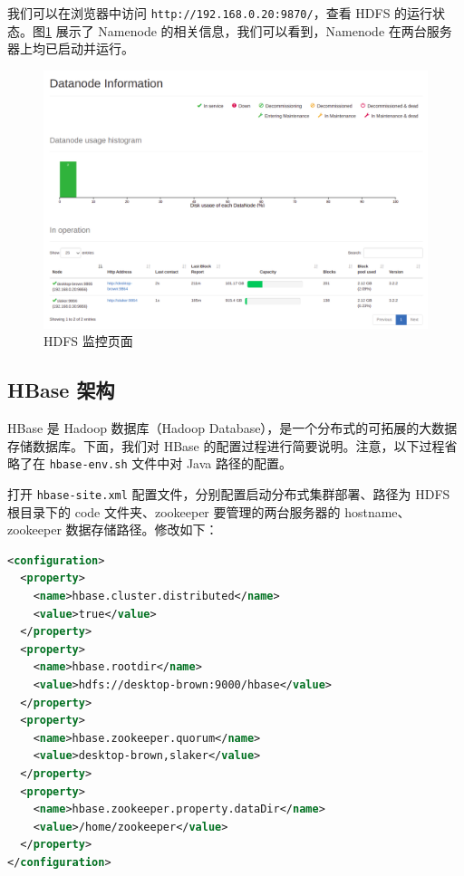 \documentclass{ctexart}
\newcommand{\code}[1]{\colorbox{backcolor}{\lstinline|#1|}}
\begin{document}
    我们可以在浏览器中访问 \code{http://192.168.0.20:9870/}，查看 HDFS 的运行状态。图\ref{fig:archicture_hdfs-web} 展示了 Namenode 的相关信息，我们可以看到，Namenode 在两台服务器上均已启动并运行。

    \begin{figure}[t]
        \centering
        \includegraphics[width=\textwidth]{src/archicture_hdfs-web}
        \caption{HDFS 监控页面}
        \label{fig:archicture_hdfs-web}
    \end{figure}

    \subsection{HBase 架构}\label{subsec:crawl}

    HBase 是 Hadoop 数据库（Hadoop Database），是一个分布式的可拓展的大数据存储数据库\cite{docs-hbase}。下面，我们对 HBase 的配置过程进行简要说明。注意，以下过程省略了在 \code{hbase-env.sh} 文件中对 Java 路径的配置。

    打开 \code{hbase-site.xml} 配置文件，分别配置启动分布式集群部署、路径为 HDFS 根目录下的 code 文件夹、zookeeper 要管理的两台服务器的 hostname、zookeeper 数据存储路径。修改如下：

    \begin{lstlisting}[language=XML]
<configuration>
  <property>
    <name>hbase.cluster.distributed</name>
    <value>true</value>
  </property>
  <property>
    <name>hbase.rootdir</name>
    <value>hdfs://desktop-brown:9000/hbase</value>
  </property>
  <property>
    <name>hbase.zookeeper.quorum</name>
    <value>desktop-brown,slaker</value>
  </property>
  <property>
    <name>hbase.zookeeper.property.dataDir</name>
    <value>/home/zookeeper</value>
  </property>
</configuration>
    \end{lstlisting}
\end{document}
